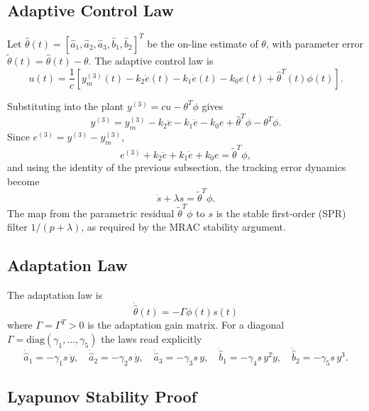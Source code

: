\documentclass[12pt]{article}
\begin{document}
\subsection{Adaptive Control Law}

\noindent Let \(\hat{\theta}(t)=[\hat{a}_1,\hat{a}_2,\hat{a}_3,\hat{b}_1,\hat{b}_2]^T\) be the on-line estimate of \(\theta\), with parameter error \(\tilde{\theta}(t)=\hat{\theta}(t)-\theta\). The adaptive control law is
\[
\boxed{
u(t)=
\frac{1}{c}
\left[
y_m^{(3)}(t)
-
k_2\ddot{e}(t)
-
k_1\dot{e}(t)
-
k_0e(t)
+
\hat{\theta}^T(t)\phi(t)
\right].
}
\]

\noindent Substituting into the plant \(y^{(3)}=cu-\theta^T\phi\) gives
\[
y^{(3)}
=
y_m^{(3)}
-
k_2\ddot{e}
-
k_1\dot{e}
-
k_0e
+
\hat{\theta}^T\phi
-
\theta^T\phi.
\]
\noindent Since \(e^{(3)}=y^{(3)}-y_m^{(3)}\),
\[
e^{(3)}
+
k_2\ddot{e}
+
k_1\dot{e}
+
k_0e
=
\tilde{\theta}^T\phi,
\]
\noindent and using the identity of the previous subsection, the tracking error dynamics become
\[
\boxed{
\dot{s}+\lambda s=\tilde{\theta}^T\phi.
}
\]
\noindent The map from the parametric residual \(\tilde{\theta}^T\phi\) to \(s\) is the stable first-order (SPR) filter \(1/(p+\lambda)\), as required by the MRAC stability argument.

\subsection{Adaptation Law}

\noindent The adaptation law is
\[
\boxed{
\dot{\hat{\theta}}(t)=-\Gamma\phi(t)s(t)
}
\]
\noindent where \(\Gamma=\Gamma^T>0\) is the adaptation gain matrix. For a diagonal \(\Gamma=\text{diag}(\gamma_1,\dots,\gamma_5)\) the laws read explicitly
\[
\dot{\hat{a}}_1=-\gamma_1 s\,\ddot{y},
\quad
\dot{\hat{a}}_2=-\gamma_2 s\,\dot{y},
\quad
\dot{\hat{a}}_3=-\gamma_3 s\,y,
\quad
\dot{\hat{b}}_1=-\gamma_4 s\,y^2\dot{y},
\quad
\dot{\hat{b}}_2=-\gamma_5 s\,y^3.
\]

\subsection{Lyapunov Stability Proof}
\end{document}
